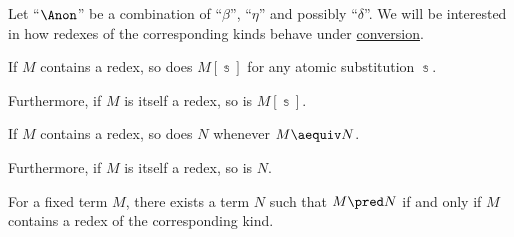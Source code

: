 \begin{proposition}\label{thm:beta_eta_redexes}
  Let \enquote{\( {\Anon} \)} be a combination of \enquote{\( \beta \)}, \enquote{\( \eta \)} and possibly \enquote{\( \delta \)}. We will be interested in how redexes of the corresponding kinds behave under \hyperref[con:lambda_conversion]{conversion}.

  \begin{thmenum}
     If \( M \) contains a redex, so does \( M[\Bbbs] \) for any atomic substitution \( \Bbbs \).

    Furthermore, if \( M \) is itself a redex, so is \( M[\Bbbs] \).

     If \( M \) contains a redex, so does \( N \) whenever \( M \aequiv N \).

    Furthermore, if \( M \) is itself a redex, so is \( N \).

     For a fixed term \( M \), there exists a term \( N \) such that \( M \pred N \) if and only if \( M \) contains a redex of the corresponding kind.
  \end{thmenum}
\end{proposition}
